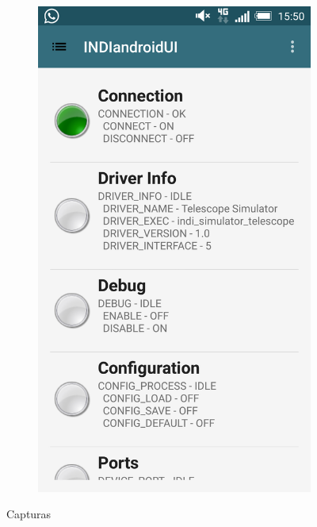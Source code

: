 \begin{figure}
\begin{subfigure}[]{0.4\textwidth}
        \includegraphics[width=\textwidth]{../images/captura2.png}
        \caption{}
        \label{fig:captura2}
    \end{subfigure}
    \caption{Capturas}\label{fig:capturas}
\end{figure}


